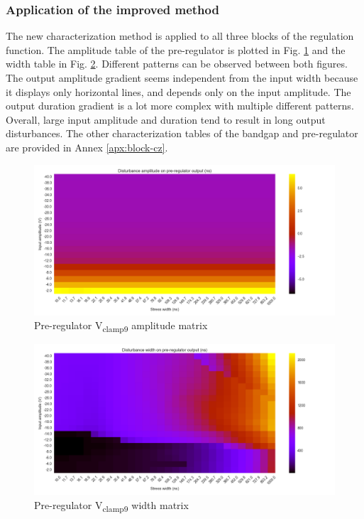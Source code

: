 
\subsubsection{Application of the improved method}

The new characterization method is applied to all three blocks of the regulation function.
The amplitude table of the pre-regulator is plotted in Fig. \ref{fig:pre_regu_amp} and the width table in Fig. \ref{fig:pre_regu_width}.
Different patterns can be observed between both figures.
The output amplitude gradient seems independent from the input width because it displays only horizontal lines, and depends only on the input amplitude.
The output duration gradient is a lot more complex with multiple different patterns.
Overall, large input amplitude and duration tend to result in long output disturbances.
The other characterization tables of the bandgap and pre-regulator are provided in Annex \ref{apx:block-cz}.

\begin{figure}[!h]
  \centering
  \includegraphics[width=\textwidth]{src/4/figures/vpre_cz_v2_amplitude.png}
  \caption{Pre-regulator V\textsubscript{clamp9} amplitude matrix}
  \label{fig:pre_regu_amp}
\end{figure}

\begin{figure}[!h]
  \centering
  \includegraphics[width=\textwidth]{src/4/figures/vpre_cz_v2_width.png}
  \caption{Pre-regulator V\textsubscript{clamp9} width matrix}
  \label{fig:pre_regu_width}
\end{figure}


